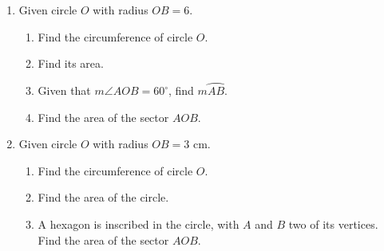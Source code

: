 \begin{enumerate}
\item Given circle $O$ with radius $OB=6$.
  \begin{multicols}{2}
   \raggedcolumns
   \begin{enumerate}
     \item Find the circumference of circle $O$. \vspace{1.7cm}
     \item Find its area.  \vspace{2cm}
     \item Given that $m\angle AOB=60^\circ$, find $m \wideparen{AB}$. \vspace{1cm}%
     \item Find the area of the sector $AOB$. \vspace{1.5cm}
   \end{enumerate}
  \end{multicols}  \vspace{3cm}

\item Given circle $O$ with radius $OB=3$ cm.
  \begin{multicols}{2}
  \raggedcolumns
  \begin{enumerate}
    \item Find the circumference of circle $O$. \vspace{1.7cm}
    \item Find the area of the circle.  \vspace{2cm}
    \item A hexagon is inscribed in the circle, with $A$ and $B$ two of its vertices. \\[0.25cm]
    Find the area of the sector $AOB$. \vspace{1.5cm}
  \end{enumerate}
  \end{multicols}  \vspace{4cm}
  

\end{enumerate}
